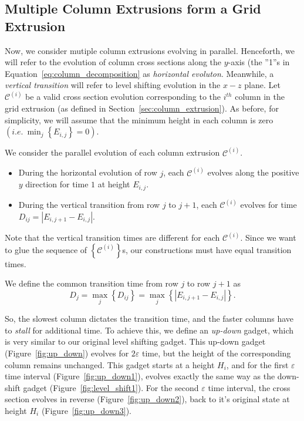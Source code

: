 \subsection{Multiple Column Extrusions form a Grid Extrusion}
\label{sec:grid_extrusion}

Now, we consider mutiple column extrusions evolving in parallel.
Henceforth, we will refer to the evolution of column cross sections along the $y$-axis
(the ''1''s in Equation~\ref{eq:column_decomposition} as \emph{horizontal evoluton}.
Meanwhile, a \emph{vertical transition} will refer to level shifting evolution in the $x-z$ plane.
Let $\mathcal C^{(i)}$ be a valid cross section evolution corresponding
to the $i^{th}$ column in the grid extrusion (as defined in Section~\ref{sec:column_extrusion}).
As before, for simplicity, we will assume that the minimum height in each column is zero $\left( i.e.\ \min_j\left\{ E_{i,j}\right\} = 0 \right)$.

%

We consider the parallel evolution of each column extrusion $\mathcal C^{(i)}$.
\begin{itemize}
    \item During the horizontal evolution of row $j$, each $\mathcal C^{(i)}$ evolves along the positive $y$ direction for time $1$ at height $E_{i,j}$.
    \item During the vertical transition from row $j$ to $j+1$, each $\mathcal C^{(i)}$ evolves for time $ D_{ij} = \left| E_{i,j+1}-E_{i,j}\right|$.
\end{itemize}
Note that the vertical transition times are different for each $\mathcal C^{(i)}$.
Since we want to glue the sequence of $\left\{ \mathcal C^{(i)}\right\}$s, our constructions must have equal transition times.

\begin{definition}
\label{def:slowest_column}
We define the common transition time from row $j$ to row $j+1$ as
$$D_j = \max_j\left\{ D_{ij}\right\} = \max_j\left\{ \left| E_{i,j+1}-E_{i,j}\right|\right\}.$$
\end{definition}

So, the slowest column dictates the transition time, and the faster columns have to \emph{stall} for additional time.
To achieve this, we define an \emph{up-down} gadget, which is very similar to our original level shifting gadget.
This up-down gadget (Figure~\ref{fig:up_down}) evolves for $2\varepsilon$ time, but the height of the corresponding column remains unchanged.
This gadget starts at a height $H_i$, and for the first $\varepsilon$ time interval (Figure~\ref{fig:up_down1}),
evolves exactly the same way as the down-shift gadget (Figure~\ref{fig:level_shift1}).
For the second $\varepsilon$ time interval, the cross section evolves in reverse (Figure~\ref{fig:up_down2}),
back to it's original state at height $H_i$ (Figure~\ref{fig:up_down3}).

